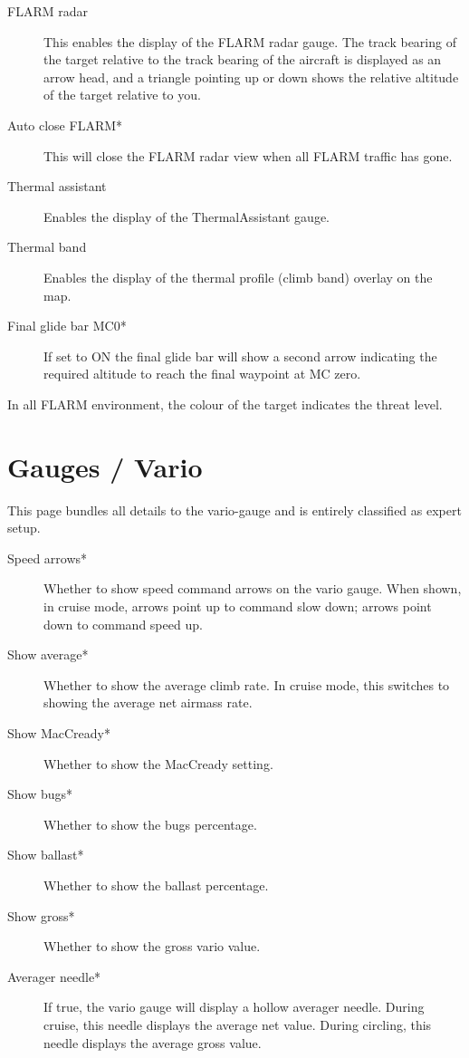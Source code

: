 \begin{description}
\item[FLARM radar]  \label{conf:flarmdisplay} This enables the display of the FLARM 
  radar gauge. The track bearing of the target relative to the track bearing of the 
  aircraft is displayed as an arrow head, and a triangle pointing up or down shows 
  the relative altitude of the target relative to you.
\\
\item[Auto close FLARM*]  This will close the FLARM radar view when all FLARM 
  traffic has gone.
\item[Thermal assistant] \label{conf:thermalassistant} Enables the display of the
  ThermalAssistant gauge.
\item[Thermal band] \label{conf:thermalband} Enables the display of the
  thermal profile (climb band) overlay on the map.
\item[Final glide bar MC0*]  If set to ON the final glide bar will show a second arrow 
  indicating the required altitude to reach the final waypoint at MC zero.
\end{description}
In all FLARM environment, the colour of the target indicates the threat level.


\section{Gauges / Vario}\label{sec:vario-gauge}

This page bundles all details to the vario-gauge and is entirely classified as expert setup.

\begin{description}
\item[Speed arrows*]  \label{conf:variogauge} Whether to show speed command 
  arrows on the vario gauge.
  When shown, in cruise mode, arrows point up to command slow down; arrows point down 
  to command speed up.
\item[Show average*]  Whether to show the average climb rate.  In cruise mode, this 
  switches to showing the average net airmass rate.
\item[Show MacCready*]  Whether to show the MacCready setting.
\item[Show bugs*]  Whether to show the bugs percentage.
\item[Show ballast*]  Whether to show the ballast percentage.
\item[Show gross*]  Whether to show the gross vario value.
\item[Averager needle*]  If true, the vario gauge will display a hollow averager
  needle. During cruise, this needle displays the average net value. During circling, 
  this needle displays the average gross value.
\end{description}

